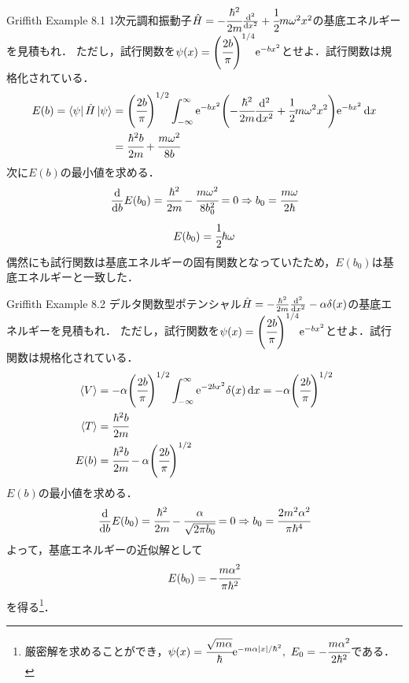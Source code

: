 \documentclass{report}
\begin{document}
  \begin{myexc}{Griffith Example 8.1}{}
    1次元調和振動子$\hat{H} = -\cfrac{\hbar^2}{2m}\dv[2]{x} + \cfrac{1}{2}m\omega^2 x^2$の基底エネルギーを見積もれ．
    ただし，試行関数を$\psi(x) = \qty(\cfrac{2b}{\pi})^{1/4}\mathrm{e}^{-bx^2}$とせよ．試行関数は規格化されている．
    \tcblower
    \begin{align}
      E(b) = \bra{\psi}\hat{H}\ket{\psi} &= \qty(\cfrac{2b}{\pi})^{1/2}\int_{-\infty}^{\infty}\mathrm{e}^{-bx^2}\qty(-\cfrac{\hbar^2}{2m}\dv[2]{x} + \cfrac{1}{2}m\omega^2x^2)\mathrm{e}^{-bx^2}\dd{x}\\
      &=\cfrac{\hbar^2b}{2m}+\cfrac{m\omega^2}{8b}
    \end{align}
    次に$E(b)$の最小値を求める．
    \begin{align}
      \dv{b}E(b_0) = \cfrac{\hbar^2}{2m} - \cfrac{m\omega^2}{8b_{0}^2} = 0\Rightarrow b_0 = \cfrac{m\omega}{2\hbar}
    \end{align}
    \begin{align}
      E(b_0) = \cfrac{1}{2}\hbar\omega
    \end{align}
    偶然にも試行関数は基底エネルギーの固有関数となっていたため，$E(b_0)$は基底エネルギーと一致した．
  \end{myexc}
  \begin{myexc}{Griffith Example 8.2}{}
    デルタ関数型ポテンシャル$\hat{H} = -\frac{\hbar^2}{2m}\dv[2]{x}-\alpha \delta(x)$の基底エネルギーを見積もれ．
    ただし，試行関数を$\psi(x) = \qty(\cfrac{2b}{\pi})^{1/4}\mathrm{e}^{-bx^2}$とせよ．試行関数は規格化されている．
    \tcblower
    \begin{align}
      \ev{V} &= -\alpha \qty(\cfrac{2b}{\pi})^{1/2}\int_{-\infty}^{\infty}\e^{-2bx^2}\delta(x)\dd{x} = -\alpha\qty(\cfrac{2b}{\pi})^{1/2}\\
      \ev{T} &= \cfrac{\hbar^2 b}{2m}\\
      E(b) &= \cfrac{\hbar^2 b}{2m} - \alpha\qty(\cfrac{2b}{\pi})^{1/2}
    \end{align}
    $E(b)$の最小値を求める．
    \begin{align}
      \dv{b}E(b_0) = \cfrac{\hbar^2}{2m} - \cfrac{\alpha}{\sqrt{2\pi b_0}} = 0\Rightarrow b_0=\cfrac{2m^2\alpha^2}{\pi\hbar^4}
    \end{align}
    よって，基底エネルギーの近似解として
    \begin{align}
      E(b_0) = -\cfrac{m\alpha^2}{\pi\hbar^2}
    \end{align}
    を得る\footnote{
      厳密解を求めることができ，$\psi(x) = \cfrac{\sqrt{m\alpha}}{\hbar}\mathrm{e}^{-m\alpha\abs{x}/\hbar^2},\ E_0 = -\cfrac{m\alpha^2}{2\hbar^2}$である．
    }．
  \end{myexc}
\end{document}
